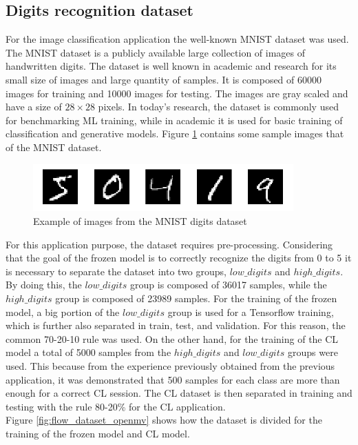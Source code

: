 \documentclass[12pt]{report}
\begin{document}
\subsection{Digits recognition dataset}
For the image classification application the well-known MNIST dataset was used. The MNIST dataset is a publicly available large collection of images of handwritten digits. The dataset is well known in academic and research for its small size of images and large quantity of samples. It is composed of 60000 images for training and 10000 images for testing. The images are gray scaled and have a size of $28 \times 28$ pixels. In today's research, the dataset is commonly used for benchmarking ML training, while in academic it is used for basic training of classification and generative models. Figure \ref{fig:mnist_dataset} contains some sample images that of the MNIST dataset.\\

\begin{figure}[h!]
    \centering
    \includegraphics[width=100mm]{Figures/Chapter4/mnist_dataset.png} 
    \caption{Example of images from the MNIST digits dataset}
    \label{fig:mnist_dataset}    
\end{figure}

For this application purpose, the dataset requires pre-processing. Considering that the goal of the frozen model is to correctly recognize the digits from 0 to 5 it is necessary to separate the dataset into two groups, $low\_digits$ and $high\_digits$. By doing this, the $low\_digits$ group is composed of 36017 samples, while the $high\_digits$ group is composed of 23989 samples. For the training of the frozen model, a big portion of the $low\_digits$ group is used for a Tensorflow training, which is further also separated in train, test, and validation. For this reason, the common 70-20-10 rule was used. On the other hand, for the training of the CL model a total of 5000 samples from the $high\_digits$ and $low\_digits$ groups were used. This because from the experience previously obtained from the previous application, it was demonstrated that 500 samples for each class are more than enough for a correct CL session. The CL dataset is then separated in training and testing with the rule 80-20\% for the CL application. \\
Figure \ref{fig:flow_dataset_openmv} shows how the dataset is divided for the training of the frozen model and CL model.
\end{document}
